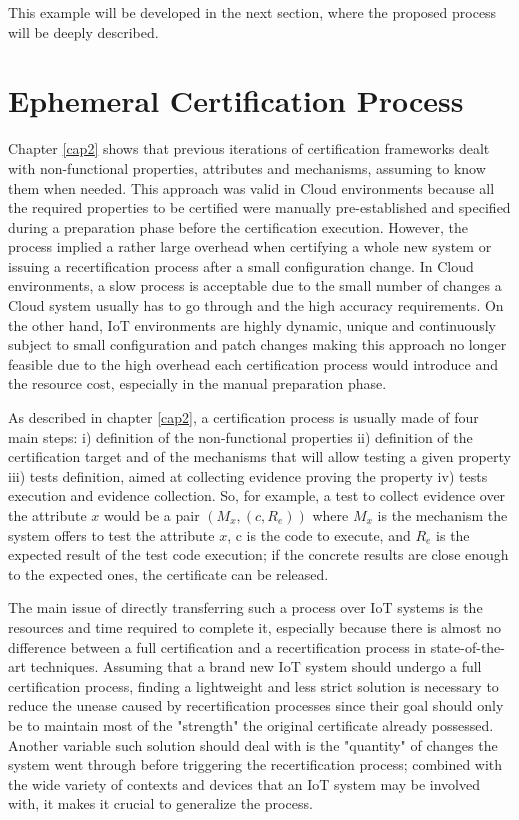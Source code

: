 This example will be developed in the next section, where the proposed process will be deeply described.


\section{Ephemeral Certification Process}
Chapter \ref{cap2} shows that previous iterations of certification frameworks dealt with non-functional properties, attributes and mechanisms, assuming to know them when needed. This approach was valid in Cloud environments because all the required properties to be certified were manually pre-established and specified during a preparation phase before the certification execution. However, the process implied a rather large overhead when certifying a whole new system or issuing a recertification process after a small configuration change. In Cloud environments, a slow process is acceptable due to the small number of changes a Cloud system usually has to go through and the high accuracy requirements. On the other hand, IoT environments are highly dynamic, unique and continuously subject to small configuration and patch changes making this approach no longer feasible due to the high overhead each certification process would introduce and the resource cost, especially in the manual preparation phase.

As described in chapter \ref{cap2}, a certification process is usually made of four main steps: i) definition of the non-functional properties ii) definition of the certification target and of the mechanisms that will allow testing a given property iii) tests definition, aimed at collecting evidence proving the property iv) tests execution and evidence collection. So, for example, a test to collect evidence over the attribute \(x\) would be a pair \( (M_x, (c, R_e) ) \) where \(M_x\) is the mechanism the system offers to test the attribute \(x\), c is the code to execute, and \(R_e\) is the expected result of the test code execution; if the concrete results are close enough to the expected ones, the certificate can be released.

The main issue of directly transferring such a process over IoT systems is the resources and time required to complete it, especially because there is almost no difference between a full certification and a recertification process in state-of-the-art techniques. Assuming that a brand new IoT system should undergo a full certification process, finding a lightweight and less strict solution is necessary to reduce the unease caused by recertification processes since their goal should only be to maintain most of the "strength" the original certificate already possessed. Another variable such solution should deal with is the "quantity" of changes the system went through before triggering the recertification process; combined with the wide variety of contexts and devices that an IoT system may be involved with, it makes it crucial to generalize the process.

